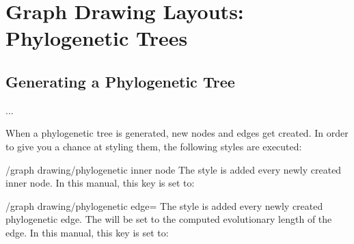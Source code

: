 %
%
%


\section{Graph Drawing Layouts: Phylogenetic Trees}
\label{section-library-graphdrawing-phylogenetics}

{}






\subsection{Generating a Phylogenetic Tree}

...

When a phylogenetic tree is generated, new nodes and edges get
created. In order to give you a chance at styling them, the following
styles are executed:

\begin{stylekey}{/graph drawing/phylogenetic inner node}
  The style is added every newly created inner node. In this manual,
  this key is set to:
\begin{codeexample}
\end{codeexample}
\end{stylekey}

\begin{stylekey}{/graph drawing/phylogenetic edge=}
  The style is added every newly created phylogenetic edge. The
   will be set to the computed evolutionary length of the
  edge. In this manual, this key is set to:
\begin{codeexample}
\end{codeexample}
\end{stylekey}


